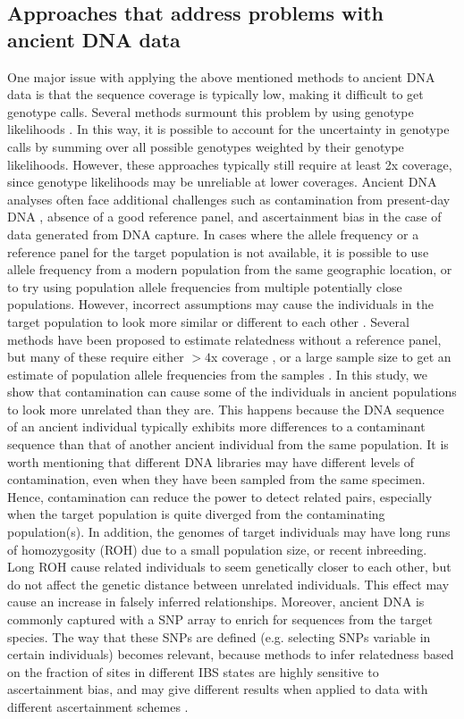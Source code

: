 \documentclass[12pt, letterpaper]{article}
\begin{document}
\subsection{Approaches that address problems with ancient DNA data}
One major issue with applying the above mentioned methods to ancient DNA data is that the sequence coverage is typically low, making it difficult to get genotype calls.
Several methods surmount this problem by using genotype likelihoods \cite{lipatov_maximum_2015,korneliussen_ngsrelate_2015}. In this way, it is possible to account for the uncertainty in genotype calls by summing over all possible genotypes weighted by their genotype likelihoods. However, these approaches typically still require at least 2x coverage, since genotype likelihoods may be unreliable at lower coverages. Ancient DNA analyses often face additional challenges such as contamination from present-day DNA \cite{peyregne_authentict_2020}, absence of a good reference panel, and ascertainment bias in the case of data generated from DNA capture. In cases where the allele frequency or a reference panel for the target population is not available, it is possible to use allele frequency from a modern population from the same geographic location, or to try using population allele frequencies from multiple potentially close populations. However, incorrect assumptions may cause the individuals in the target population to look more similar or different to each other \cite{amorim_understanding_2018}. Several methods have been proposed to estimate relatedness without a reference panel, but many of these require either $>4$x coverage \cite{waples_allele_2019}, or a large sample size to get an estimate of population allele frequencies from the samples \cite{theunert_joint_2017}. In this study, we show that contamination can cause some of the individuals in ancient populations to look more unrelated than they are. This happens because the DNA sequence of an ancient individual typically exhibits more differences to a contaminant sequence than that of another ancient individual from the same population. It is worth mentioning that different DNA libraries may have different levels of contamination, even when they have been sampled from the same specimen. Hence, contamination can reduce the power to detect related pairs, especially when the target population is quite diverged from the contaminating population(s). In addition, the genomes of target individuals may have long runs of homozygosity (ROH) due to a small population size, or recent inbreeding. Long ROH cause related individuals to seem genetically closer to each other, but do not affect the genetic distance between unrelated individuals. This effect may cause an increase in falsely inferred relationships. Moreover, ancient DNA is commonly captured with a SNP array to enrich for sequences from the target species. The way that these SNPs are defined (e.g. selecting SNPs variable in certain individuals) becomes relevant, because methods to infer relatedness based on the fraction of sites in different IBS states are highly sensitive to ascertainment bias, and may give different results when applied to data with different ascertainment schemes \cite{waples_allele_2019}. 
\end{document}
